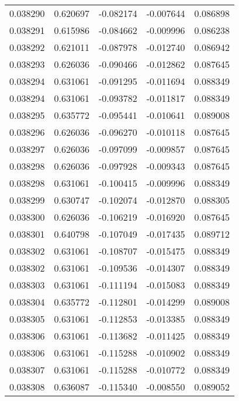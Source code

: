 \begin{tabular}{lrrrr}
0.038290    &  0.620697 & -0.082174 & -0.007644 &             0.086898 \\
0.038291    &  0.615986 & -0.084662 & -0.009996 &             0.086238 \\
0.038292    &  0.621011 & -0.087978 & -0.012740 &             0.086942 \\
0.038293    &  0.626036 & -0.090466 & -0.012862 &             0.087645 \\
0.038294    &  0.631061 & -0.091295 & -0.011694 &             0.088349 \\
0.038294    &  0.631061 & -0.093782 & -0.011817 &             0.088349 \\
0.038295    &  0.635772 & -0.095441 & -0.010641 &             0.089008 \\
0.038296    &  0.626036 & -0.096270 & -0.010118 &             0.087645 \\
0.038297    &  0.626036 & -0.097099 & -0.009857 &             0.087645 \\
0.038298    &  0.626036 & -0.097928 & -0.009343 &             0.087645 \\
0.038298    &  0.631061 & -0.100415 & -0.009996 &             0.088349 \\
0.038299    &  0.630747 & -0.102074 & -0.012870 &             0.088305 \\
0.038300    &  0.626036 & -0.106219 & -0.016920 &             0.087645 \\
0.038301    &  0.640798 & -0.107049 & -0.017435 &             0.089712 \\
0.038302    &  0.631061 & -0.108707 & -0.015475 &             0.088349 \\
0.038302    &  0.631061 & -0.109536 & -0.014307 &             0.088349 \\
0.038303    &  0.631061 & -0.111194 & -0.015083 &             0.088349 \\
0.038304    &  0.635772 & -0.112801 & -0.014299 &             0.089008 \\
0.038305    &  0.631061 & -0.112853 & -0.013385 &             0.088349 \\
0.038306    &  0.631061 & -0.113682 & -0.011425 &             0.088349 \\
0.038306    &  0.631061 & -0.115288 & -0.010902 &             0.088349 \\
0.038307    &  0.631061 & -0.115288 & -0.010772 &             0.088349 \\
0.038308    &  0.636087 & -0.115340 & -0.008550 &             0.089052 \\

\end{tabular}
